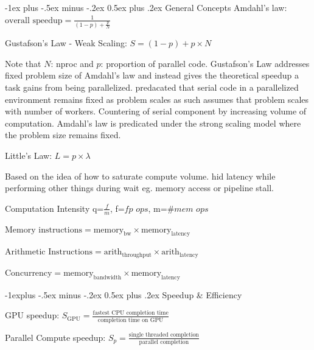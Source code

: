 \documentclass[letter,8pt,landscape]{article}
\makeatletter
\renewcommand{\section}{\@startsection{section}{1}{0mm}%
                                {-1ex plus -.5ex minus -.2ex}%
                                {0.5ex plus .2ex}%
                                {\normalfont\large\bfseries}}
\renewcommand{\subsection}{\@startsection{subsection}{2}{0mm}%
                                {-1explus -.5ex minus -.2ex}%
                                {0.5ex plus .2ex}%
                                {\normalfont\normalsize\bfseries}}
\makeatother
\begin{document}
\raggedright
\footnotesize

\begin{multicols}{3}
\setlength{\premulticols}{1pt}
\setlength{\postmulticols}{1pt}
\setlength{\multicolsep}{1pt}
\setlength{\columnsep}{2pt}

\vfill
\smallskip

  \section{General Concepts}
  Amdahl's law: $\text{overall speedup} = \frac{1}{(1-p) +
  \frac{p}{N}}$

  Gustafson's Law - Weak Scaling: $S = (1-p) + p \times N$

  Note that $N$: nproc and $p$: proportion of parallel code. Gustafson's Law
  addresses fixed problem size of Amdahl's law and instead gives the theoretical
  speedup a task gains from being parallelized. predacated that serial code in a
  parallelized environment remains fixed as problem scales as such assumes that
  problem scales with number of workers. Countering of serial component by
  increasing volume of computation. Amdahl's law is predicated under the strong
  scaling model where the problem size remains fixed.

  Little's Law: $L = p \times \lambda$
  
  Based on the idea of how to saturate compute volume. hid latency while
  performing other things during wait eg. memory access or pipeline stall.

  Computation Intensity q=$\frac{f}{m}$, f=$\textit{fp ops}$, m=$\textit{\# mem ops}$

  $\text{Memory instructions} = \text{memory}_\text{bw} \times \text{memory}_\text{latency}$

  $\text{Arithmetic Instructions} = \text{arith}_\text{throughput} \times \text{arith}_\text{latency}$

  $\text{Concurrency} = \text{memory}_\text{bandwidth} \times \text{memory}_\text{latency}$

  \subsection{Speedup \& Efficiency}


  GPU speedup: $S_\text{GPU} = \frac{\text{fastest CPU completion
  time}}{\text{completion time on GPU}}$

  Parallel Compute speedup: $S_p = \frac{\text{single threaded
  completion}}{\text{parallel completion}}$


\end{multicols}
\end{document}
